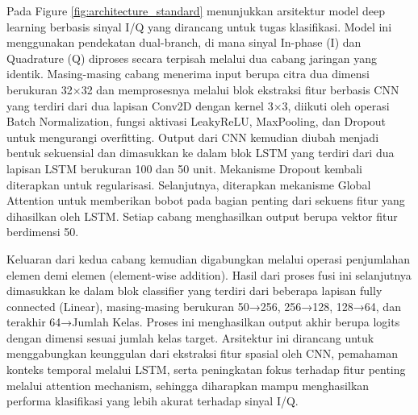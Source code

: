 \documentclass{article}
\begin{document}
Pada Figure \ref{fig:architecture_standard} menunjukkan arsitektur model deep learning berbasis sinyal I/Q yang dirancang untuk tugas klasifikasi. Model ini menggunakan pendekatan dual-branch, di mana sinyal In-phase (I) dan Quadrature (Q) diproses secara terpisah melalui dua cabang jaringan yang identik. 
Masing-masing cabang menerima input berupa citra dua dimensi berukuran 32×32 dan memprosesnya melalui blok ekstraksi fitur berbasis CNN yang terdiri dari dua lapisan Conv2D dengan kernel 3×3, diikuti oleh operasi Batch Normalization, fungsi aktivasi LeakyReLU, MaxPooling, dan Dropout untuk mengurangi overfitting. 
Output dari CNN kemudian diubah menjadi bentuk sekuensial dan dimasukkan ke dalam blok LSTM yang terdiri dari dua lapisan LSTM berukuran 100 dan 50 unit. 
Mekanisme Dropout kembali diterapkan untuk regularisasi. Selanjutnya, diterapkan mekanisme Global Attention untuk memberikan bobot pada bagian penting dari sekuens fitur yang dihasilkan oleh LSTM. Setiap cabang menghasilkan output berupa vektor fitur berdimensi 50.

Keluaran dari kedua cabang kemudian digabungkan melalui operasi penjumlahan elemen demi elemen (element-wise addition). Hasil dari proses fusi ini selanjutnya dimasukkan ke dalam blok classifier yang terdiri dari beberapa lapisan fully connected (Linear), masing-masing berukuran 50→256, 256→128, 128→64, dan terakhir 64→Jumlah Kelas. 
Proses ini menghasilkan output akhir berupa logits dengan dimensi sesuai jumlah kelas target. Arsitektur ini dirancang untuk menggabungkan keunggulan dari ekstraksi fitur spasial oleh CNN, pemahaman konteks temporal melalui LSTM, serta peningkatan fokus terhadap fitur penting melalui attention mechanism, sehingga diharapkan mampu 
menghasilkan performa klasifikasi yang lebih akurat terhadap sinyal I/Q.
\end{document}

